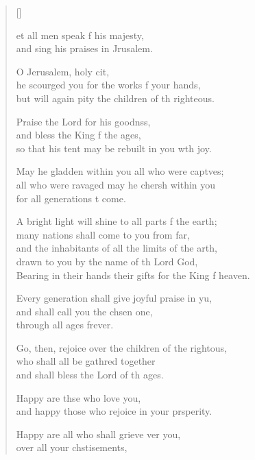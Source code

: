 \settowidth{\versewidth}{Bearing in their hands their gifts for the King of heaven.}
\begin{verse}[\versewidth]
  \begin{patverse}
et all men speak f his majesty,\Med\\
and sing his praises in Jrusalem.

O Jerusalem, holy cit,\Flex\\
he scourged you for the works f your hands,\Med\\
but will again pity the children of th righteous.

Praise the Lord for his goodnss,\Flex\\
and bless the King f the ages,\Med\\
so that his tent may be rebuilt in you w\pointup{\i}th joy.

May he gladden within you all who were capt\pointup{\i}ves;\Flex\\
all who were ravaged may he cher\pointup{\i}sh within you\Med\\
for all generations t come.

A bright light will shine to all parts f the earth;\Med\\
many nations shall come to you from far,\\
and the inhabitants of all the limits of the arth,\Flex\\
drawn to you by the name of th Lord God,\Med\\
Bearing in their hands their gifts for the King f heaven.

Every generation shall give joyful praise in yu,\Flex\\
and shall call you the chsen one,\Med\\
through all ages frever.

Go, then, rejoice over the children of the rightous,\Flex\\
who shall all be gathred together\Med\\
and shall bless the Lord of th ages.

Happy are thse who love you,\Med\\
and happy those who rejoice in your prsperity.

Happy are all who shall grieve ver you,\Med\\
over all your chstisements,


\end{patverse}
\end{verse}
